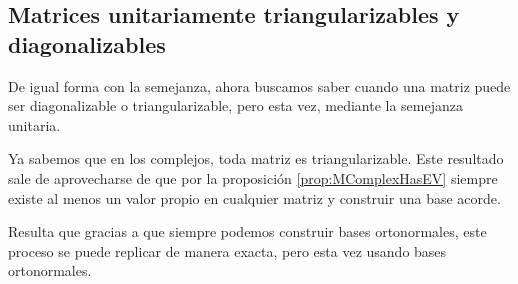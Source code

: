 \subsection{Matrices unitariamente triangularizables y diagonalizables}

De igual forma con la semejanza, ahora buscamos saber cuando una matriz puede ser diagonalizable o triangularizable, pero esta vez, mediante la semejanza unitaria. 

Ya sabemos que en los complejos, toda matriz es triangularizable. Este resultado sale de aprovecharse de que por la proposición \ref{prop:MComplexHasEV} siempre existe al menos un valor propio en cualquier matriz y construir una base acorde.

Resulta que gracias a que siempre podemos construir bases ortonormales, este proceso se puede replicar de manera exacta, pero esta vez usando bases ortonormales.

